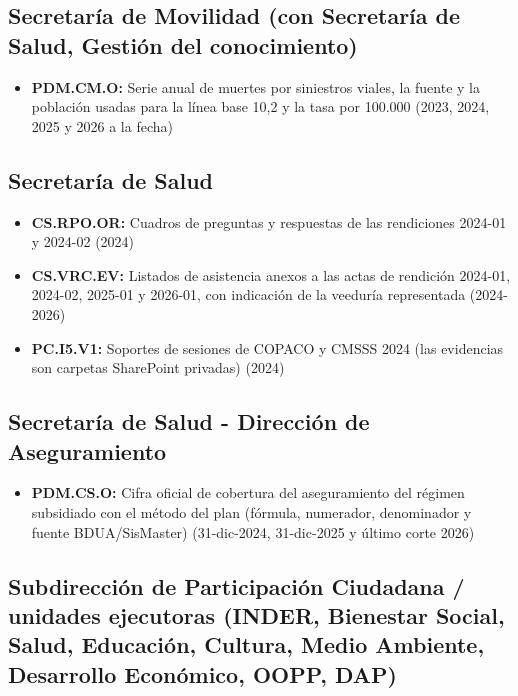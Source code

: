 \documentclass[11pt,letterpaper]{article}
\begin{document}
\subsection*{Secretaría de Movilidad (con Secretaría de Salud, Gestión del conocimiento)}

\begin{itemize}

\item \textbf{PDM.CM.O:} Serie anual de muertes por siniestros viales, la fuente y la población usadas para la línea base 10,2 y la tasa por 100.000 (2023, 2024, 2025 y 2026 a la fecha)

\end{itemize}

\subsection*{Secretaría de Salud}

\begin{itemize}

\item \textbf{CS.RPO.OR:} Cuadros de preguntas y respuestas de las rendiciones 2024-01 y 2024-02 (2024)

\item \textbf{CS.VRC.EV:} Listados de asistencia anexos a las actas de rendición 2024-01, 2024-02, 2025-01 y 2026-01, con indicación de la veeduría representada (2024-2026)

\item \textbf{PC.I5.V1:} Soportes de sesiones de COPACO y CMSSS 2024 (las evidencias son carpetas SharePoint privadas) (2024)

\end{itemize}

\subsection*{Secretaría de Salud - Dirección de Aseguramiento}

\begin{itemize}

\item \textbf{PDM.CS.O:} Cifra oficial de cobertura del aseguramiento del régimen subsidiado con el método del plan (fórmula, numerador, denominador y fuente BDUA/SisMaster) (31-dic-2024, 31-dic-2025 y último corte 2026)

\end{itemize}

\subsection*{Subdirección de Participación Ciudadana / unidades ejecutoras (INDER, Bienestar Social, Salud, Educación, Cultura, Medio Ambiente, Desarrollo Económico, OOPP, DAP)}
\end{document}
